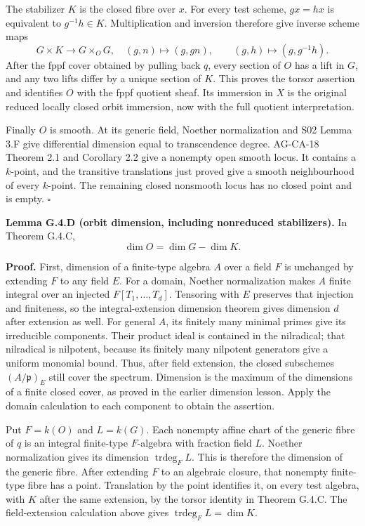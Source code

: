 \documentclass[11pt,a4paper,openany]{report}
\newcounter{none}
\begin{document}
The stabilizer \(K\) is the closed fibre over \(x\). For every test scheme, \(g x=h x\) is equivalent to \(g^{-1}h\in K\). Multiplication and inversion therefore give inverse scheme maps \[
G\times K\longrightarrow G\times_O G,\quad(g,n)\longmapsto(g,gn),
\qquad(g,h)\longmapsto(g,g^{-1}h).
\] After the fppf cover obtained by pulling back \(q\), every section of \(O\) has a lift in \(G\), and any two lifts differ by a unique section of \(K\). This proves the torsor assertion and identifies \(O\) with the fppf quotient sheaf. Its immersion in \(X\) is the original reduced locally closed orbit immersion, now with the full quotient interpretation.

Finally \(O\) is smooth. At its generic field, Noether normalization and S02 Lemma 3.F give differential dimension equal to transcendence degree. AG-CA-18 Theorem 2.1 and Corollary 2.2 give a nonempty open smooth locus. It contains a \(k\)-point, and the transitive translations just proved give a smooth neighbourhood of every \(k\)-point. The remaining closed nonsmooth locus has no closed point and is empty. \(\square\)

\textbf{Lemma G.4.D (orbit dimension, including nonreduced stabilizers).} In Theorem G.4.C, \[
\dim O=\dim G-\dim K.
\]

\textbf{Proof.} First, dimension of a finite-type algebra \(A\) over a field \(F\) is unchanged by extending \(F\) to any field \(E\). For a domain, Noether normalization makes \(A\) finite integral over an injected \(F[T_1,\ldots,T_d]\). Tensoring with \(E\) preserves that injection and finiteness, so the integral-extension dimension theorem gives dimension \(d\) after extension as well. For general \(A\), its finitely many minimal primes give its irreducible components. Their product ideal is contained in the nilradical; that nilradical is nilpotent, because its finitely many nilpotent generators give a uniform monomial bound. Thus, after field extension, the closed subschemes \((A/\mathfrak p)_E\) still cover the spectrum. Dimension is the maximum of the dimensions of a finite closed cover, as proved in the earlier dimension lesson. Apply the domain calculation to each component to obtain the assertion.

Put \(F=k(O)\) and \(L=k(G)\). Each nonempty affine chart of the generic fibre of \(q\) is an integral finite-type \(F\)-algebra with fraction field \(L\). Noether normalization gives its dimension \(\operatorname{trdeg}_F L\). This is therefore the dimension of the generic fibre. After extending \(F\) to an algebraic closure, that nonempty finite-type fibre has a point. Translation by the point identifies it, on every test algebra, with \(K\) after the same extension, by the torsor identity in Theorem G.4.C. The field-extension calculation above gives \(\operatorname{trdeg}_F L=\dim K\).
\end{document}
